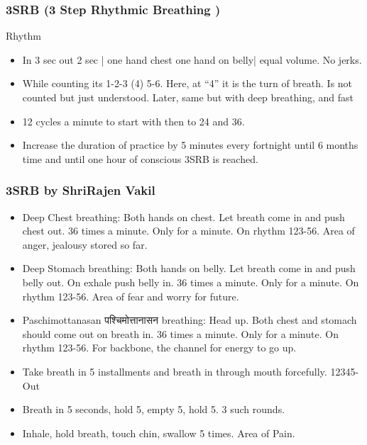 \begin{frame}[fragile]
\frametitle{3SRB (3 Step Rhythmic Breathing )}

Rhythm

\begin{itemize}
\item In 3 sec out 2 sec | one hand chest one hand on belly| equal volume. No jerks. 
\item  While counting its 1-2-3 (4) 5-6. Here, at ``4'' it is the turn of breath. Is not counted but just understood. Later, same but with deep breathing, and fast
\item 12 cycles a minute to start with then to 24 and 36.
\item  Increase the duration of practice by 5 minutes every fortnight until 6 months time and until one hour of conscious 3SRB is reached.
\end{itemize}
\end{frame}


\begin{frame}[fragile]
\frametitle{3SRB by ShriRajen Vakil}


\begin{itemize}
\item Deep Chest breathing: Both hands on chest. Let breath come in and push chest out. 36 times a minute. Only for a minute. On rhythm 123-56. Area of anger, jealousy stored so far.
\item Deep Stomach breathing: Both hands on belly. Let breath come in and push belly out. On exhale push belly in. 36 times a minute. Only for a minute. On rhythm 123-56. Area of fear and worry for future.
\item Paschimottanasan पश्चिमोत्तानासन  breathing: Head up. Both chest and stomach should come out on breath in. 36 times a minute. Only for a minute. On rhythm 123-56. For backbone, the channel for energy to go up.
\item Take breath in 5 installments and breath in through mouth forcefully. 12345-Out
\item Breath in 5 seconds, hold 5, empty 5, hold 5. 3 such rounds.
\item Inhale, hold breath, touch chin, swallow 5 times. Area of Pain.

\end{itemize}
\end{frame}
